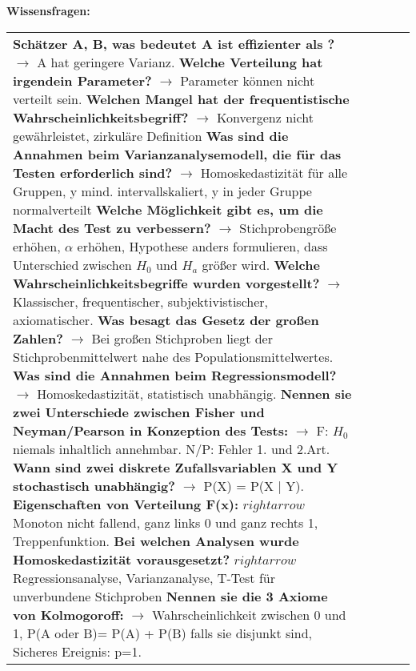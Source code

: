 \documentclass[fleqn, oneside, 10pt, titlepage]{article}
\begin{document}
\textbf{Wissensfragen:}\\
\scriptsize{
\begin{tabularx}{\textwidth}{p{13em}p{13em}p{13em}p{13em}p{10em}}
\textbf{Schätzer A, B, was bedeutet A ist effizienter als ?} $\rightarrow$ A hat geringere Varianz. \newline
\textbf{Welche Verteilung hat irgendein Parameter?} $\rightarrow$ Parameter können nicht verteilt sein. \newline
\textbf{Welchen Mangel hat der frequentistische Wahrscheinlichkeitsbegriff?} $\rightarrow$ Konvergenz nicht gewährleistet, zirkuläre Definition \newline 
\textbf{Was sind die Annahmen beim Varianzanalysemodell, die für das Testen erforderlich sind?} $\rightarrow$ Homoskedastizität für alle Gruppen, y mind. intervallskaliert, y in jeder Gruppe normalverteilt \newline
\textbf{Welche Möglichkeit gibt es, um die Macht des Test zu verbessern?} $\rightarrow$ Stichprobengröße erhöhen, $\alpha$ erhöhen, Hypothese anders formulieren, dass Unterschied zwischen $H_0$ und $H_a$ größer wird. \newline
\textbf{Welche Wahrscheinlichkeitsbegriffe wurden vorgestellt?} $\rightarrow$ Klassischer, frequentischer, subjektivistischer, axiomatischer. \newline
\textbf{Was besagt das Gesetz der großen Zahlen?} $\rightarrow$ Bei großen Stichproben liegt der Stichprobenmittelwert nahe des Populationsmittelwertes. \newline
\textbf{Was sind die Annahmen beim Regressionsmodell?} $\rightarrow$ Homoskedastizität, statistisch unabhängig. \newline
\textbf{Nennen sie zwei Unterschiede zwischen Fisher und Neyman/Pearson in Konzeption des Tests:} $\rightarrow$ F: $H_0$ niemals inhaltlich annehmbar. N/P: Fehler 1. und 2.Art. \newline 
\textbf{Wann sind zwei diskrete Zufallsvariablen X und Y stochastisch unabhängig?} $\rightarrow$ P(X) = P(X | Y). \newline
\textbf{Eigenschaften von Verteilung F(x):} $rightarrow$ Monoton nicht fallend, ganz links 0 und ganz rechts 1, Treppenfunktion. \newline
\textbf{Bei welchen Analysen wurde Homoskedastizität vorausgesetzt?} $rightarrow$ Regressionsanalyse, Varianzanalyse, T-Test für unverbundene Stichproben \newline
\textbf{Nennen sie die 3 Axiome von Kolmogoroff:} $\rightarrow$ Wahrscheinlichkeit zwischen 0 und 1, P(A oder B)= P(A) + P(B) falls sie disjunkt sind, Sicheres Ereignis: p=1. \newline


\end{tabularx}}
\end{document}
